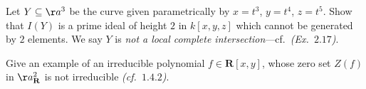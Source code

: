 \documentclass[openany, amssymb, psamsfonts]{amsart}
\begin{document}
\begin{exercise}[1.11]
Let $Y \subseteq \aa^3$ be the curve given parametrically by
$x = t^3$, $y= t^4$, $z = t^5$.
Show that $I(Y)$ is a prime ideal of height $2$ in $k[x,y,z]$ which cannot
be generated by $2$ elements.
We say $Y$ is \emph{not a local complete
intersection}---cf.~\emph{(Ex.~$2.17$)}. 
\end{exercise}

\begin{exercise}[1.12]
Give an example of an irreducible polynomial $f \in \mathbf{R}[x,y]$,
whose zero set $Z(f)$ in $\aa_{\mathbf{R}}^2$ is not irreducible
\emph{(cf.~$1.4.2$)}.
\end{exercise}
\end{document}
